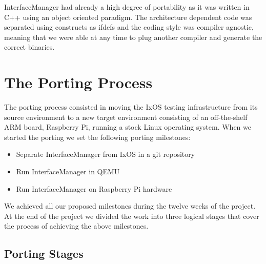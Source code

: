 InterfaceManager had already a high degree of portability as it was written
in C++ using an object oriented paradigm. The architecture dependent code was
separated using constructs as ifdefs and the coding style was compiler agnostic,
meaning that we were able at any time to plug another compiler and generate the
correct binaries.

\section{The Porting Process}

The porting process consisted in moving the IxOS testing infrastructure from its
source environment to a new target environment consisting of an off-the-shelf
ARM board, Raspberry Pi, running a stock Linux operating system. When we started
the porting we set the following porting milestones:
\begin{itemize}
    \item Separate InterfaceManager from IxOS in a git repository
    \item Run InterfaceManager in QEMU
    \item Run InterfaceManager on Raspberry Pi hardware
\end{itemize}
We achieved all our proposed milestones during the twelve weeks of the project.
At the end of the project we divided the work into three logical stages
that cover the process of achieving the above milestones.

\subsection{Porting Stages}

